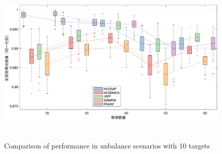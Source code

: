 \begin{figure}[!htp]
  \centering
  \includegraphics[height=8cm]{hedonic_game/BoxUnbalanceV1}
    {Comparison of performance in unbalance scenarios with 10 targets}
  \label{fig:unbalance_10Targets}
\end{figure}


